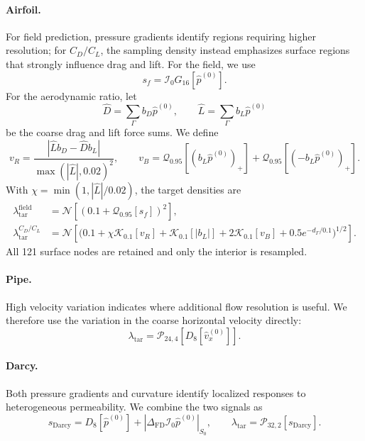 \paragraph{Airfoil.}
For field prediction, pressure gradients identify regions requiring higher
resolution; for $C_D/C_L$, the sampling density instead emphasizes surface
regions that strongly influence drag and lift. For the field, we use
\[
    s_f
    =\mathcal{I}_0G_{16}[\widehat p^{(0)}].
\]
For the aerodynamic ratio, let
\[
    \widehat D=\sum_\Gamma b_D\widehat p^{(0)},
    \qquad
    \widehat L=\sum_\Gamma b_L\widehat p^{(0)}
\]
be the coarse drag and lift force sums. We define
\begin{equation}
    v_R
    =\frac{|\widehat Lb_D-\widehat Db_L|}
           {\max(|\widehat L|,0.02)^2},
    \qquad
    v_B
    =\mathcal{Q}_{0.95}[(b_L\widehat p^{(0)})_+]
     +\mathcal{Q}_{0.95}[(-b_L\widehat p^{(0)})_+].
    \label{eq:app_density_airfoil_signals}
\end{equation}
With
$\chi=\min(1,|\widehat L|/0.02)$, the target densities are
\begin{equation}
    \begin{aligned}
    \lambda_{\mathrm{tar}}^{\mathrm{field}}
       &=\mathcal{N}\!\left[
          (0.1+\mathcal{Q}_{0.95}[s_f])^{2}
          \right],\\
    \lambda_{\mathrm{tar}}^{C_D/C_L}
       &=\mathcal{N}\!\left[
          \bigl(
          0.1+\chi\mathcal{K}_{0.1}[v_R]
          +\mathcal{K}_{0.1}[|b_L|]
          +2\mathcal{K}_{0.1}[v_B]
          +0.5e^{-d_\Gamma/0.1}
          \bigr)^{1/2}
          \right].
    \end{aligned}
    \label{eq:app_density_airfoil_ratio}
\end{equation}
All 121 surface nodes are retained and only the interior is resampled.

\paragraph{Pipe.}
High velocity variation indicates where additional flow resolution is useful.
We therefore use the variation in the coarse horizontal velocity directly:
\begin{equation}
    \lambda_{\mathrm{tar}}
    =\mathcal{P}_{24,4}
       [D_8[\widehat v_x^{(0)}]].
    \label{eq:app_cpg_pipe_density}
\end{equation}

\paragraph{Darcy.}
Both pressure gradients and curvature identify localized responses to
heterogeneous permeability. We combine the two signals as
\begin{equation}
    s_{\mathrm{Darcy}}
    =D_8[\widehat p^{(0)}]
     +|\Delta_{\mathrm{FD}}
        \mathcal{I}_0\widehat p^{(0)}|_{S_0},
    \qquad
    \lambda_{\mathrm{tar}}
    =\mathcal{P}_{32,2}[s_{\mathrm{Darcy}}].
    \label{eq:app_cpg_darcy_density}
\end{equation}

